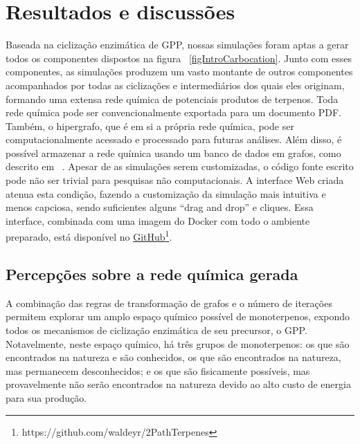 \chapter{Resultados e discussões}
\label{Resultados}

Baseada na ciclização enzimática de GPP, nossas simulações foram aptas a gerar todos os componentes dispostos na figura ~\ref{figIntroCarbocation}. Junto com esses componentes, as simulações produzem um vasto montante de outros componentes acompanhados por todas as ciclizações e intermediários dos quais eles originam, formando uma extensa rede química de potenciais produtos de terpenos. Toda rede química pode ser convencionalmente exportada para um documento PDF.  Também, o hipergrafo, que é em si a própria rede química, pode ser computacionalmente acessado e processado para futuras análises. Além disso, é possível armazenar a rede química usando um banco de dados em grafos, como descrito em ~\cite{Silva2018graph}. Apesar de as simulações serem customizadas, o código fonte escrito pode não ser trivial para pesquisas não computacionais. A interface Web criada atenua esta condição, fazendo a customização da simulação mais intuitiva e menos capciosa, sendo suficientes alguns “drag and drop” e cliques.   Essa interface, combinada com uma imagem do Docker com todo o ambiente preparado, está disponível no \href{https://github.com/waldeyr/2PathTerpenes}{GitHub}\footnote{https://github.com/waldeyr/2PathTerpenes}.

\section{Percepções sobre a rede química gerada}

A combinação das regras de transformação de grafos e o número de iterações permitem explorar um amplo espaço químico possível de monoterpenos, expondo todos os mecanismos de ciclização enzimática de seu precursor, o GPP. Notavelmente, neste espaço químico, há três grupos de monoterpenos: os que são encontrados na natureza e são conhecidos, os que são encontrados na natureza, mas permanecem desconhecidos; e os que são fisicamente possíveis, mas provavelmente não serão encontrados na natureza devido ao alto custo de energia para sua produção. 

